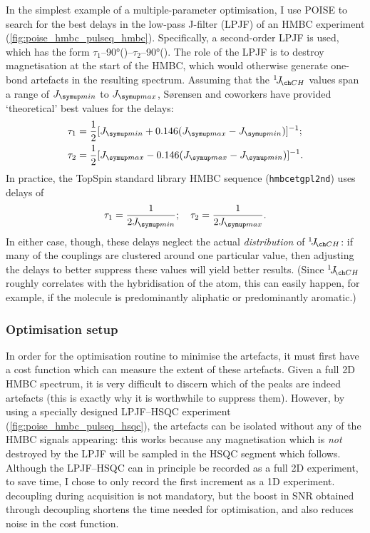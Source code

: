 In the simplest example of a multiple-parameter optimisation, I use POISE to search for the best delays in the low-pass J-filter (LPJF) of an HMBC experiment (\cref{fig:poise_hmbc_pulseq_hmbc}).
Specifically, a second-order LPJF is used, which has the form $\tau_1$--\ang{90}(\carbon{})--$\tau_2$--\ang{90}(\carbon{}).
The role of the LPJF is to destroy  magnetisation at the start of the HMBC, which would otherwise generate one-bond artefacts in the resulting spectrum.
Assuming that the $\oneJ{CH}$ values span a range of $\Jmin$ to $\Jmax$, S{\o}rensen and coworkers have provided `theoretical' best values for the delays:\autocite{Nielsen1986JMR,Meissner2000MRC}
\begin{align}
    \tau_1 &= \frac{1}{2} [\Jmin + 0.146(\Jmax - \Jmin)]^{-1}; \label{eq:hmbc_lpjf_theoretical_min} \\
    \tau_2 &= \frac{1}{2} [\Jmax - 0.146(\Jmax - \Jmin)]^{-1}. \label{eq:hmbc_lpjf_theoretical_max}
\end{align}
In practice, the TopSpin standard library HMBC sequence (\texttt{hmbcetgpl2nd}) uses delays of
\begin{equation}
    \tau_1 = \frac{1}{2\Jmin}; \quad \tau_2 = \frac{1}{2\Jmax}. \label{eq:hmbc_lpjf_bruker}
\end{equation}
In either case, though, these delays neglect the actual \textit{distribution} of $\oneJ{CH}$: if many of the couplings are clustered around one particular value, then adjusting the delays to better suppress these values will yield better results.
(Since $\oneJ{CH}$ roughly correlates with the hybridisation of the \carbon{} atom,\autocite{Krivdin2018PNMRS} this can easily happen, for example, if the molecule is predominantly aliphatic or predominantly aromatic.)


\subsubsection{Optimisation setup}

In order for the optimisation routine to minimise the artefacts, it must first have a cost function which can measure the extent of these artefacts.
Given a full 2D HMBC spectrum, it is very difficult to discern which of the peaks are indeed artefacts (this is exactly why it is worthwhile to suppress them).
However, by using a specially designed LPJF--HSQC experiment (\cref{fig:poise_hmbc_pulseq_hsqc}), the artefacts can be isolated without any of the HMBC signals appearing:
this works because any  magnetisation which is \textit{not} destroyed by the LPJF will be sampled in the HSQC segment which follows.
Although the LPJF--HSQC can in principle be recorded as a full 2D experiment, to save time, I chose to only record the first increment as a 1D experiment.
\carbon{} decoupling during acquisition is not mandatory, but the boost in SNR obtained through decoupling shortens the time needed for optimisation, and also reduces noise in the cost function.

